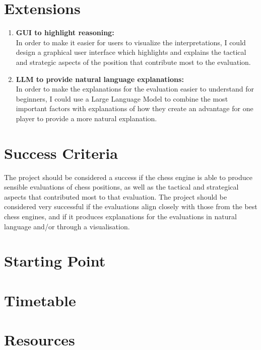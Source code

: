 \documentclass[12pt,a4paper]{article}
\begin{document}
\section*{Extensions}
\begin{enumerate}
    \item \textbf{GUI to highlight reasoning:}
    \\In order to make it easier for users to visualize the interpretations, I could design a graphical user interface which highlights and explains the tactical and strategic aspects of the position that contribute most to the evaluation.
    \item \textbf{LLM to provide natural language explanations:}
    \\In order to make the explanations for the evaluation easier to understand for beginners, I could use a Large Language Model to combine the most important factors with explanations of how they create an advantage for one player to provide a more natural explanation.
\end{enumerate}



\section*{Success Criteria}
The project should be considered a success if the chess engine is able to produce sensible evaluations of chess positions, as well as the tactical and strategical aspects that contributed most to that evaluation. The project should be considered very successful if the evaluations align closely with those from the best chess engines, and if it produces explanations for the evaluations in natural language and/or through a visualisation.

\section*{Starting Point}


\section*{Timetable}

\section*{Resources}
\end{document}
